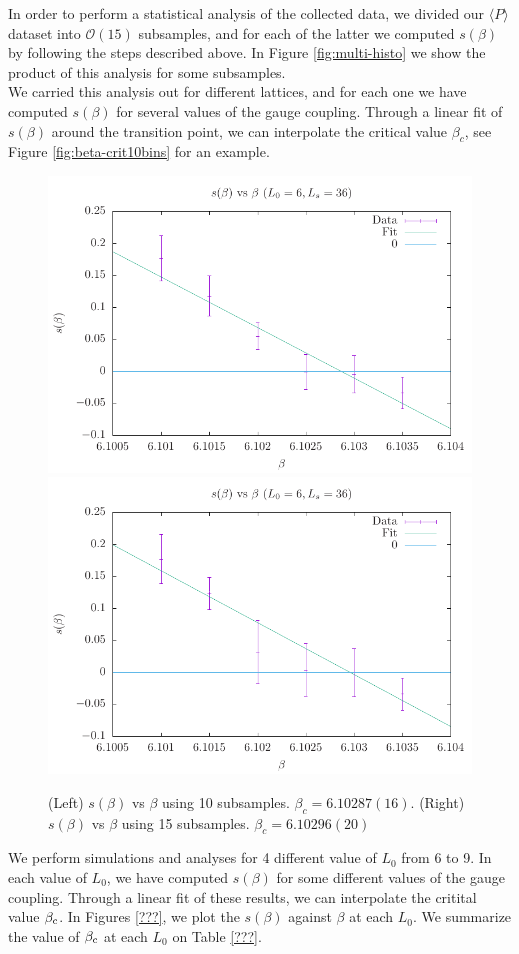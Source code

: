 \documentclass{article}
\begin{document}
In order to perform a statistical analysis of the collected data, we divided our $\langle P \rangle$ dataset into $\mathcal{O}(15)$ subsamples, and for each of the latter we computed $s(\beta)$ by following the steps described above. In Figure \ref{fig:multi-histo} we show the product of this analysis for some subsamples. \\
We carried this analysis out for different lattices, and for each one we have computed $s(\beta)$ for several values of the gauge coupling. Through a linear fit of $s(\beta)$ around the transition point, we can interpolate the critical value $\beta_c$, see Figure \ref{fig:beta-crit10bins} for an example.%
\begin{figure}
    \centering
    \includegraphics[width=0.45\hsize]{imgs/s_beta.pdf}
    \includegraphics[width=0.45\hsize]{imgs/s_beta_2.pdf}
    
    \caption{(Left) $s(\beta)$ vs $\beta$ using 10 subsamples. $\beta_c = 6.10287(16)$. (Right) $s(\beta)$ vs $\beta$ using 15 subsamples. $\beta_c = 6.10296(20)$}
    \label{fig:beta-crit}
\end{figure}

\newpage
We perform simulations and analyses for 4 different value of $L_0$ from 6 to 9.
In each value of $L_0$, we have computed $s(\beta)$ for some different values of the gauge coupling.
Through a linear fit of these results, we can interpolate the critital value $\beta_{\rm c}$.
In Figures \ref{???}, we plot the $s(\beta)$ against $\beta$ at each $L_0$.
We summarize the value of $\beta_{\rm c}$ at each $L_0$ on Table \ref{???}.
\end{document}

